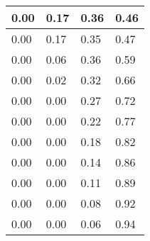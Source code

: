 \begin{table}[ht]
\begin{tabular}{|p{2.5cm}|p{2.5cm}|p{2.5cm}|p{2.5cm}|}
        0.00                        & 0.17                          & 0.36                           & 0.46                           \\ \hline
        0.00                        & 0.17                          & 0.35                           & 0.47                           \\ \hline
        0.00                        & 0.06                          & 0.36                           & 0.59                           \\ \hline
        0.00                        & 0.02                          & 0.32                           & 0.66                           \\ \hline
        0.00                        & 0.00                          & 0.27                           & 0.72                           \\ \hline
        0.00                        & 0.00                          & 0.22                           & 0.77                           \\ \hline
        0.00                        & 0.00                          & 0.18                           & 0.82                           \\ \hline
        0.00                        & 0.00                          & 0.14                           & 0.86                           \\ \hline
        0.00                        & 0.00                          & 0.11                           & 0.89                           \\ \hline
        0.00                        & 0.00                          & 0.08                           & 0.92                           \\ \hline
        0.00                        & 0.00                          & 0.06                           & 0.94                           \\ \hline
    \end{tabular}
\end{table}

